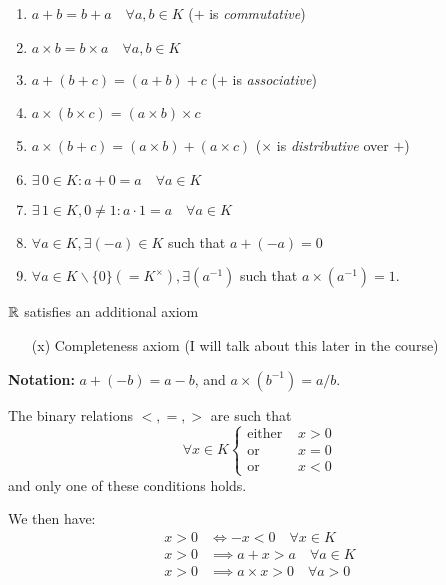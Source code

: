 \documentclass[twoside]{scrartcl}
\begin{document}
\begin{axiom}[Axioms of $K = \Q, K = \R$]
\begin{enumerate}
\item $a + b = b + a \quad \forall a,b \in K$ ($+$ is \emph{commutative})
\item $a \times b = b \times a \quad \forall a,b \in K$	
\item $a + (b+c) = (a+b) + c$ ($+$ is \emph{associative})
\item $a \times (b \times c) = (a\times b)\times c$
\item $a \times (b + c) = (a\times b ) + (a\times c)$ ($\times$ is \emph{distributive} over $+$)
\item $\exists\, 0 \in K: a + 0 = a \quad \forall a \in K$
\item $\exists\, 1 \in K, 0 \neq 1: a \cdot 1 = a \quad \forall a \in K$
\item $\forall a \in K, \exists (-a) \in K$ such that $a + (-a) = 0$
\item $\forall a \in K \backslash\{0\} (= K^{\times}), \exists (a^{-1})$ such that $a \times (a^{-1}) = 1$. 	
\end{enumerate}\vspace*{5pt}

$\mathbb{R}$ satisfies an additional axiom
\begin{enumerate}
\item[(x)] Completeness axiom (I will talk about this later in the course)	
\end{enumerate}
\end{axiom}\vspace*{5pt}


\textbf{Notation:}  $a + (-b) = a-b$, and $a \times (b^{-1}) = a/b$.\\

\begin{axiom}
The binary relations $<, =, >$ are such that 
\[\forall x \in K \begin{cases}
 \text{either } &x > 0 \\
 \text{or } &x = 0\\
 \text{or } &x < 0	
 \end{cases}
\]	
and only one of these conditions holds.
\end{axiom}
We then have: 
\[
\begin{aligned}
  x > 0 &\iff -x < 0\quad \forall x \in K\\
  x > 0 &\implies a + x > a \quad \forall a \in K\\
  x > 0 &\implies a \times x > 0 \quad \forall a > 0
\end{aligned}
\]
\end{document}
